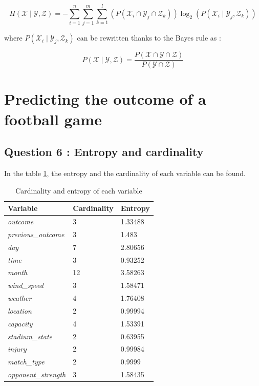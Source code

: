 \documentclass[titlepage]{article}
\begin{document}
$$H(\mathcal{X} \mid \mathcal{Y}, \mathcal{Z})=-\sum_{i=1}^n \sum_{j=1}^m \sum_{k=1}^l(P(\mathcal{X}_i \cap \mathcal{Y}_j \cap \mathcal{Z}_k)) \log _2(P(\mathcal{X}_i \mid \mathcal{Y}_j, \mathcal{Z}_k))$$

where $P(\mathcal{X}_i \mid \mathcal{Y}_j, \mathcal{Z}_k)$ can be rewritten thanks to the Bayes rule as : 

$$P(\mathcal{X} \mid \mathcal{Y}, \mathcal{Z}) = \frac{P(\mathcal{X} \cap \mathcal{Y} \cap \mathcal{Z})}{P(\mathcal{Y} \cap \mathcal{Z})}$$

\newpage 

\section{Predicting the outcome of a football game}

\subsection*{Question 6 : Entropy and cardinality}

In the table \ref{tab:entropy}, the entropy and the cardinality of each variable can be found. 

\begin{table}[h!]
    \centering
    \small
    \setlength{\tabcolsep}{4pt}
    \begin{tabular}{|p{3cm}|p{2cm}|p{2cm}|}
        \hline 
        \textbf{Variable} & \textbf{Cardinality} & \textbf{Entropy}  \\
        \hline
        \textit{outcome} & 3 & 1.33488\\
        \hline
        \textit{previous\_outcome} & 3 & 1.483\\
        \hline
        \textit{day} & 7 & 2.80656\\
        \hline
        \textit{time} & 3 & 0.93252\\
        \hline
        \textit{month} & 12 & 3.58263\\
        \hline
        \textit{wind\_speed} & 3 & 1.58471\\
        \hline
        \textit{weather} & 4 & 1.76408\\
        \hline
        \textit{location} & 2 & 0.99994\\
        \hline
        \textit{capacity} & 4 & 1.53391\\
        \hline
        \textit{stadium\_state} & 2 & 0.63955\\
        \hline
        \textit{injury} & 2 & 0.99984\\
        \hline
        \textit{match\_type} & 2 & 0.9999\\
        \hline
        \textit{opponent\_strength} & 3 & 1.58435\\
        \hline
    \end{tabular}
    \caption{Cardinality and entropy of each variable}
    \label{tab:entropy}
\end{table}
\end{document}
